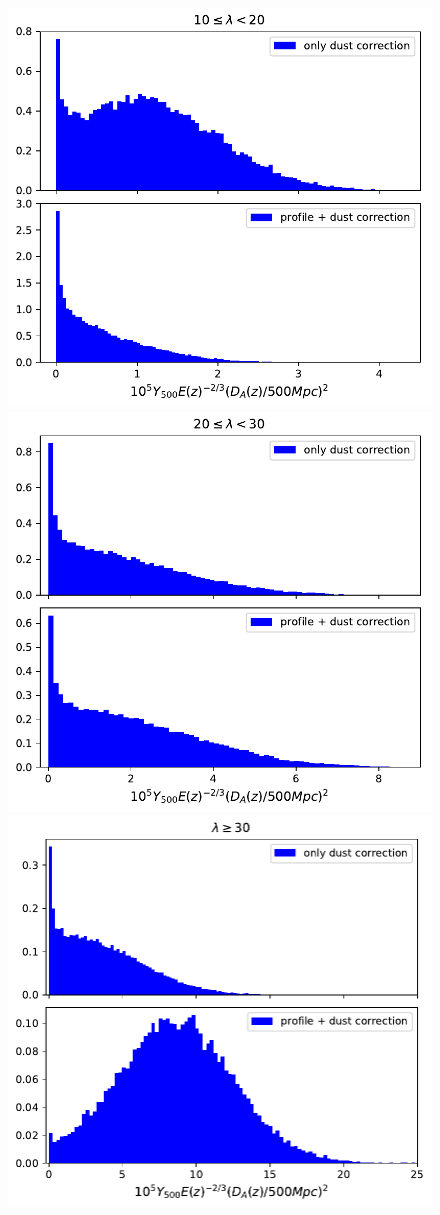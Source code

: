\documentclass[a4paper,fleqn,usenatbib]{mnras}
\begin{document}
\begin{figure}
  \centering
  \includegraphics[width= 0.8\columnwidth] {chains2y500_zbin01_rbin0.pdf}
  \includegraphics[width= 0.8\columnwidth] {chains2y500_zbin01_rbin1.pdf}
  \includegraphics[width= 0.8\columnwidth] {chains2y500_zbin01_rbin2.pdf}

\end{figure}
\end{document}
